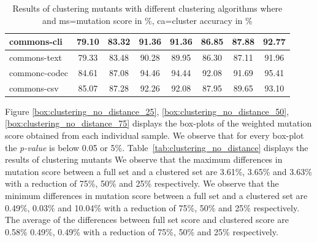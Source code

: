 \documentclass[conference,draftclsnofoot,onecolumn]{IEEEtran}
\begin{document}
\begin{table}[ht]
\begin{tabular}{|l|c|c|c|c|c|c|c|}
commons-cli                   & 79.10                                                 & 83.32                                                   & 91.36                                                    & 91.36                                                  & 86.85                                                   & 87.88                                                   & 92.77                                                      \\ \hline
commons-text                  & 79.33                                                 & 83.48                                                   & 90.28                                                    & 89.95                                                  & 86.30                                                   & 87.11                                                   & 91.96                                                      \\ \hline
commonc-codec                 & 84.61                                                 & 87.08                                                   & 94.46                                                    & 94.44                                                  & 92.08                                                   & 91.69                                                   & 95.41                                                      \\ \hline
commons-csv                   & 85.07                                                 & 87.28                                                   & 92.26                                                    & 92.08                                                  & 87.95                                                   & 89.65                                                   & 93.10                                                      \\ \hline
\end{tabular}
\caption{\label{tab:clustering_extra}Results of clustering mutants with different clustering algorithms where and ms=mutation score in \%, ca=cluster accuracy in \%}
\end{table}

Figure \ref{box:clustering_no_distance_25}, \ref{box:clustering_no_distance_50}, \ref{box:clustering_no_distance_75} displays the box-plots of the weighted mutation score obtained from each individual sample.
We observe that for every box-plot the \textit{p-value} is below 0.05 or 5\%.
Table~\ref{tab:clustering_no_distance} displays the results of clustering mutants 
We observe that the maximum differences in mutation score between a full set and a clustered set are 3.61\%, 3.65\% and 3.63\% with a reduction of 75\%, 50\% and 25\% respectively.
We observe that the minimum differences in mutation score between a full set and a clustered set are 0.49\%, 0.03\% and 10.04\%  with a reduction of 75\%, 50\% and 25\% respectively.
The average of the differences between full set score and clustered score are 0.58\% 0.49\%, 0.49\% with a reduction of 75\%, 50\% and 25\% respectively.
\end{document}

